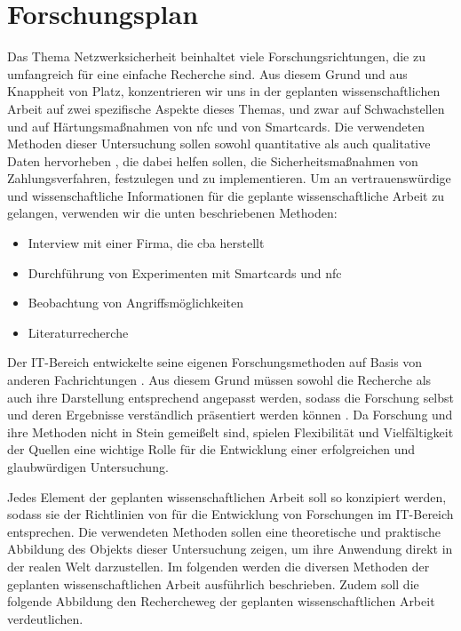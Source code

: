 \section{Forschungsplan}

Das Thema Netzwerksicherheit beinhaltet viele Forschungsrichtungen, die zu umfangreich für eine einfache
Recherche sind. Aus diesem Grund und aus Knappheit von Platz, konzentrieren wir uns in der geplanten 
wissenschaftlichen Arbeit auf zwei spezifische Aspekte dieses Themas, und zwar auf Schwachstellen und 
auf Härtungsmaßnahmen von \acrshort{nfc} und von Smartcards. Die verwendeten Methoden dieser Untersuchung 
sollen sowohl quantitative als auch qualitative Daten hervorheben \cite{refbook:RMJL}, die dabei helfen sollen, 
die Sicherheitsmaßnahmen von Zahlungsverfahren, festzulegen und zu implementieren. Um an vertrauenswürdige 
und wissenschaftliche Informationen für die geplante wissenschaftliche Arbeit zu gelangen, verwenden wir 
die unten beschriebenen Methoden:

\begin{itemize}
  \item Interview mit einer Firma, die \acrfull{cba} herstellt
  \item Durchführung von Experimenten mit Smartcards und \acrshort{nfc}
  \item Beobachtung von Angriffsmöglichkeiten
  \item Literaturrecherche
\end{itemize}

Der IT-Bereich entwickelte seine eigenen Forschungsmethoden auf Basis von anderen Fachrichtungen \cite{inbook:AHDS}.
Aus diesem Grund müssen sowohl die Recherche als auch ihre Darstellung entsprechend angepasst werden, sodass 
die Forschung selbst und deren Ergebnisse verständlich präsentiert werden können \cite{refbook:RMJL}. Da Forschung und 
ihre Methoden nicht in Stein gemeißelt sind, spielen Flexibilität und Vielfältigkeit der Quellen eine wichtige 
Rolle für die Entwicklung einer erfolgreichen und glaubwürdigen Untersuchung.

Jedes Element der geplanten wissenschaftlichen Arbeit soll so konzipiert werden, sodass sie der Richtlinien von
\cite{refip:SGRM} für die Entwicklung von Forschungen im IT-Bereich entsprechen. Die verwendeten Methoden 
sollen eine theoretische und praktische Abbildung des Objekts dieser Untersuchung zeigen, um ihre Anwendung 
direkt in der realen Welt darzustellen. Im folgenden werden die diversen Methoden der geplanten wissenschaftlichen 
Arbeit ausführlich beschrieben. Zudem soll die folgende Abbildung den Rechercheweg der geplanten wissenschaftlichen 
Arbeit verdeutlichen.


